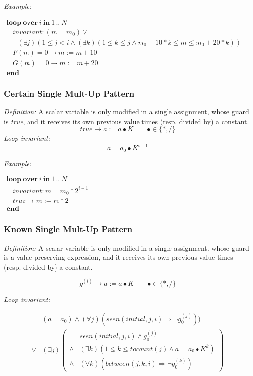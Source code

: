 \documentclass[a4paper,10pt]{article}
\newcommand{\idx}{\ensuremath{i}\xspace}
\newcommand{\idxinitial}{\ensuremath{\mathit{initial}}\xspace}
\newcommand{\KWloop}{\ensuremath{\mathrm{\textbf{loop}}~}}
\newcommand{\KWend}{\ensuremath{\mathrm{\textbf{end}}~}}
\newcommand{\KWover}{\ensuremath{\mathrm{\textbf{over}}~}}
\newcommand{\KWin}{\ensuremath{~\mathrm{\textbf{in}}~}}
\newcommand{\at}[1]{{(#1)}}
\newcommand{\impl}{\ensuremath{\Longrightarrow}}
\newcommand{\seen}[3]{\ensuremath{\mathit{seen}{(#1,#2,#3)}}\xspace}
\newcommand{\tocount}[1]{\ensuremath{\mathit{tocount}(#1)}\xspace}
\newcommand{\betweens}[3]{\ensuremath{\mathit{between}{(#1,#2,#3)}}\xspace}
\newcommand{\loopinvariant}{\noindent\textit{Loop invariant:}\xspace}
\newcommand{\patterndef}{\noindent\textit{Definition:}\xspace}
\newcommand{\patternexample}{\noindent\textit{Example:}\xspace}
\begin{document}
\bigskip
\patternexample

\medskip
$\begin{array}{l}
  \KWloop \KWover i \KWin 1~..~N \\
  ~~~~ \textit{invariant}: (m = m_0) \lor \\
  ~~~~~~~ (\exists j)(1 \leq j < i \land (\exists k)(1 \leq k \leq j \land m_0+10*k \leq m \leq m_0 +20*k))\\
  ~~~~ F(m)=0 \rightarrow m := m+10\\
  ~~~~ G(m)=0 \rightarrow m := m+20\\
  \KWend
\end{array}$

\subsubsection*{Certain Single Mult-Up Pattern}

\patterndef A scalar variable is only modified in a single assignment, whose
guard is \textit{true}, and it receives its own previous value times
(resp. divided by) a constant.
%
$$\mathit{true} \rightarrow a := a \bullet K \qquad \bullet \in \{*, / \}$$
%
\loopinvariant
%
$$a = a_0 \bullet K^{i-1}$$

\bigskip
\patternexample

\medskip
$\begin{array}{l}
  \KWloop \KWover i \KWin 1~..~N \\
  ~~~~ \textit{invariant}: m = m_0 * 2^{i-1}\\
  ~~~~ true \rightarrow m := m*2\\
  \KWend
\end{array}$

\subsubsection*{Known Single Mult-Up Pattern}

\patterndef A scalar variable is only modified in a single assignment, whose
guard is a value-preserving expression, and it receives its own previous value times
(resp. divided by) a constant.

$$g^\at{\idx} \rightarrow a := a \bullet K  \qquad \bullet \in \{*, / \}$$

\loopinvariant

\begin{eqnarray*}
&(a = a_0) \land (\forall j)(\seen{\idxinitial}{j}{\idx} \impl \neg g_0^\at{j})) \\
\lor 
& (\exists j)
\left(\begin{array}{cl}
& \seen{\idxinitial}{j}{\idx} \land g_0^\at{j} \\
\land& (\exists k)(1 \leq k \leq \tocount{j} \land a = a_0 \bullet K^k)\\
\land& (\forall k)(\betweens{j}{k}{\idx} \impl \neg g_0^\at{k})
\end{array}\right)
\end{eqnarray*}
\end{document}
